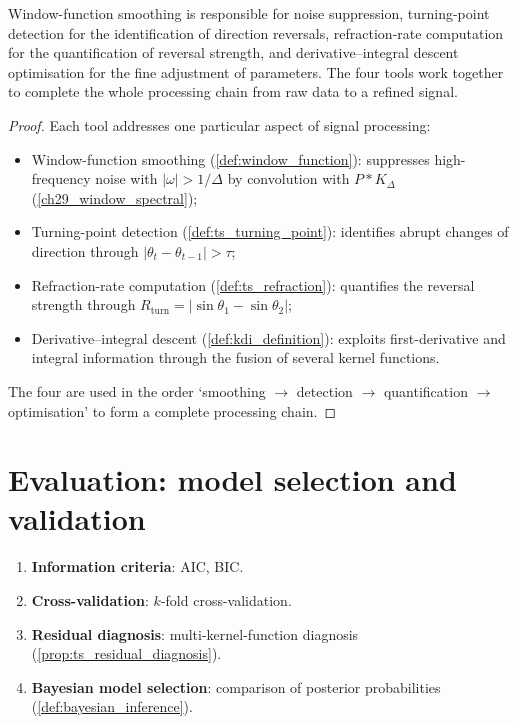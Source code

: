 \begin{proposition}\label{prop:processing_division}
Window-function smoothing is responsible for noise suppression, turning-point detection for the identification of direction reversals, refraction-rate computation for the quantification of reversal strength, and derivative--integral descent optimisation for the fine adjustment of parameters. The four tools work together to complete the whole processing chain from raw data to a refined signal.
\end{proposition}

\begin{proof}
Each tool addresses one particular aspect of signal processing:
\begin{itemize}
    \item Window-function smoothing (\cref{def:window_function}): suppresses high-frequency noise with $|\omega| > 1/\Delta$ by convolution with $P * K_\Delta$ (\cref{ch29_window_spectral});
    \item Turning-point detection (\cref{def:ts_turning_point}): identifies abrupt changes of direction through $|\theta_t - \theta_{t-1}| > \tau$;
    \item Refraction-rate computation (\cref{def:ts_refraction}): quantifies the reversal strength through $R_{\text{turn}} = |\sin\theta_1 - \sin\theta_2|$;
    \item Derivative--integral descent (\cref{def:kdi_definition}): exploits first-derivative and integral information through the fusion of several kernel functions.
\end{itemize}
The four are used in the order `smoothing $\to$ detection $\to$ quantification $\to$ optimisation' to form a complete processing chain.
\end{proof}

\section{Evaluation: model selection and validation}

\begin{definition}\label{def:evaluation_criteria}
\begin{enumerate}[label=(\roman*)]
    \item \textbf{Information criteria}: AIC, BIC.
    \item \textbf{Cross-validation}: $k$-fold cross-validation.
    \item \textbf{Residual diagnosis}: multi-kernel-function diagnosis (\cref{prop:ts_residual_diagnosis}).
    \item \textbf{Bayesian model selection}: comparison of posterior probabilities (\cref{def:bayesian_inference}).
\end{enumerate}
\end{definition}

